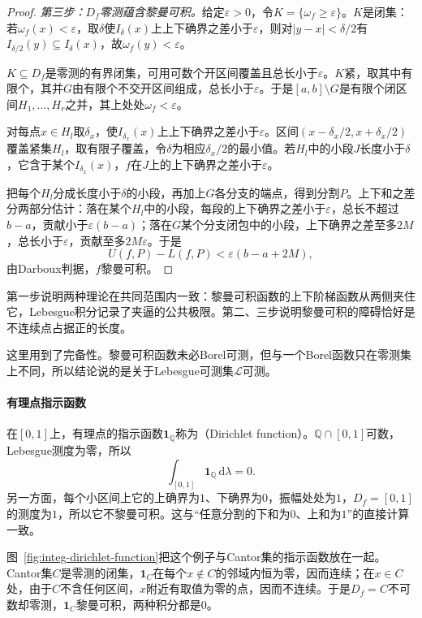 \begin{proof}
\emph{第三步：$D_f$零测蕴含黎曼可积。}给定$\varepsilon>0$，令$K=\{\omega_f\geq\varepsilon\}$。$K$是闭集：若$\omega_f(x)<\varepsilon$，取$\delta$使$I_\delta(x)$上上下确界之差小于$\varepsilon$，则对$\lvert y-x\rvert<\delta/2$有$I_{\delta/2}(y)\subseteq I_\delta(x)$，故$\omega_f(y)<\varepsilon$。

$K\subseteq D_f$是零测的有界闭集，可用可数个开区间覆盖且总长小于$\varepsilon$。$K$紧，取其中有限个，其并$G$由有限个不交开区间组成，总长小于$\varepsilon$。于是$[a,b]\setminus G$是有限个闭区间$H_1,\dots,H_r$之并，其上处处$\omega_f<\varepsilon$。

对每点$x\in H_l$取$\delta_x$，使$I_{\delta_x}(x)$上上下确界之差小于$\varepsilon$。区间$(x-\delta_x/2,x+\delta_x/2)$覆盖紧集$H_l$，取有限子覆盖，令$\delta$为相应$\delta_x/2$的最小值。若$H_l$中的小段$J$长度小于$\delta$，它含于某个$I_{\delta_x}(x)$，$f$在$J$上的上下确界之差小于$\varepsilon$。

把每个$H_l$分成长度小于$\delta$的小段，再加上$G$各分支的端点，得到分割$P$。上下和之差分两部分估计：落在某个$H_l$中的小段，每段的上下确界之差小于$\varepsilon$，总长不超过$b-a$，贡献小于$\varepsilon(b-a)$；落在$G$某个分支闭包中的小段，上下确界之差至多$2M$，总长小于$\varepsilon$，贡献至多$2M\varepsilon$。于是
\[
 U(f,P)-L(f,P)<\varepsilon(b-a+2M),
\]
由Darboux判据，$f$黎曼可积。
\end{proof}

第一步说明两种理论在共同范围内一致：黎曼可积函数的上下阶梯函数从两侧夹住它，Lebesgue积分记录了夹逼的公共极限。第二、三步说明黎曼可积的障碍恰好是不连续点占据正的长度。

这里用到了完备性。黎曼可积函数未必Borel可测，但与一个Borel函数只在零测集上不同，所以结论说的是关于Lebesgue可测集$\mathcal L$可测。

\paragraph{有理点指示函数}
在$[0,1]$上，有理点的指示函数$\mathbf 1_{\mathbb Q}$称为（Dirichlet function）。$\mathbb Q\cap[0,1]$可数，Lebesgue测度为零，所以
\[
 \int_{[0,1]}\mathbf 1_{\mathbb Q}\,\mathrm d\lambda=0 .
\]
另一方面，每个小区间上它的上确界为$1$、下确界为$0$，振幅处处为$1$，$D_f=[0,1]$的测度为$1$，所以它不黎曼可积。这与“任意分割的下和为$0$、上和为$1$”的直接计算一致。

图~\ref{fig:integ-dirichlet-function}把这个例子与Cantor集的指示函数放在一起。Cantor集$C$是零测的闭集，$\mathbf 1_C$在每个$x\notin C$的邻域内恒为零，因而连续；在$x\in C$处，由于$C$不含任何区间，$x$附近有取值为零的点，因而不连续。于是$D_f=C$不可数却零测，$\mathbf 1_C$黎曼可积，两种积分都是$0$。

